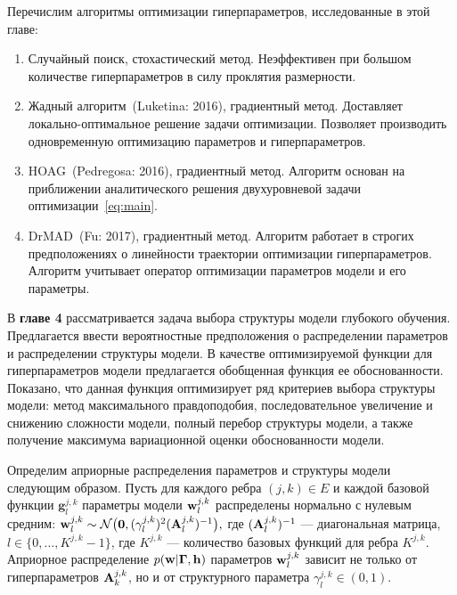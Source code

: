 \documentclass[11pt, a5paper]{dissert}
\theoremstyle{definition}
\begin{document}
{Перечислим алгоритмы оптимизации гиперпараметров, исследованные в этой главе:
\begin{enumerate}
\item Случайный поиск, стохастический метод. Неэффективен при большом количестве гиперпараметров в силу проклятия размерности.
\item Жадный алгоритм~(Luketina: 2016), градиентный метод. Доставляет локально-оптимальное решение задачи оптимизации. Позволяет производить одновременную оптимизацию параметров и гиперпараметров.
\item HOAG~(Pedregosa: 2016), градиентный метод. Алгоритм основан на приближении аналитического решения двухуровневой задачи оптимизации~\eqref{eq:main}.
\item DrMAD~(Fu: 2017), градиентный метод. Алгоритм работает в строгих предположениях о линейности траектории оптимизации гиперпараметров. Алгоритм учитывает оператор оптимизации параметров модели и его параметры.
\end{enumerate}

В \textbf{главе 4}  рассматривается задача выбора структуры модели глубокого обучения. Предлагается ввести вероятностные предположения о распределении параметров и распределении структуры модели. В качестве оптимизируемой функции для гиперпараметров модели предлагается обобщенная функция ее обоснованности. Показано, что данная функция оптимизирует ряд критериев выбора структуры модели: метод максимального правдоподобия, последовательное увеличение и снижению сложности модели, полный перебор структуры модели, а также получение максимума вариационной оценки обоснованности модели.

Определим априорные распределения параметров и структуры модели следующим образом.
Пусть для каждого ребра $(j,k) \in E$ и каждой базовой функции $\mathbf{g}^{j,k}_l$ параметры модели $\mathbf{w}^{j,k}_l$ распределены нормально с нулевым средним:
$
    \mathbf{w}^{j,k}_l \sim \mathcal{N}\bigl(\mathbf{0}, (\gamma^{j,k}_l)^2(\mathbf{A}^{j,k}_l)^{-1}\bigr),
$
где $ (\mathbf{A}^{j,k}_l)^{-1}$ --- диагональная матрица, $l \in \{0,\dots,K^{j,k}-1\}$, где $K^{j,k}$ --- количество базовых функций для ребра $K^{j,k}$. Априорное распределение $p(\mathbf{w}|\boldsymbol{\Gamma}, \mathbf{h})$ параметров $\mathbf{w}^{j,k}_l$ зависит не только от гиперпараметров $\mathbf{A}_k^{j,k}$, но и от структурного параметра $\gamma^{j,k}_l \in (0,1)$.


}
\end{document}

